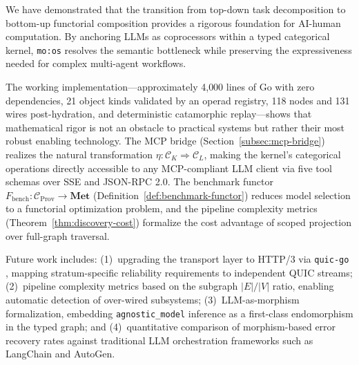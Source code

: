 \documentclass[submission,copyright,creativecommons]{eptcs}
\begin{document}
We have demonstrated that the transition from top-down task decomposition to
bottom-up functorial composition provides a rigorous foundation for
AI-human computation. By anchoring LLMs as coprocessors within a typed
categorical kernel, \texttt{mo:os} resolves the semantic bottleneck while
preserving the expressiveness needed for complex multi-agent workflows.

The working implementation---approximately 4{,}000 lines of Go with zero
dependencies, 21 object kinds validated by an operad registry, 118 nodes and
131 wires post-hydration, and deterministic catamorphic replay---shows that
mathematical rigor is not an obstacle to practical systems but rather their
most robust enabling technology.
The MCP bridge (Section~\ref{subsec:mcp-bridge}) realizes the natural
transformation $\eta\colon \mathcal{C}_K \Rightarrow \mathcal{C}_L$, making
the kernel's categorical operations directly accessible to any MCP-compliant
LLM client via five tool schemas over SSE and JSON-RPC 2.0. The benchmark
functor $F_{\mathrm{bench}}\colon \mathcal{C}_{\mathrm{Prov}} \to
\mathbf{Met}$ (Definition~\ref{def:benchmark-functor}) reduces model selection
to a functorial optimization problem, and the pipeline complexity metrics
(Theorem~\ref{thm:discovery-cost}) formalize the cost advantage of scoped
projection over full-graph traversal.

Future work includes:
(1)~upgrading the transport layer to HTTP/3 via \texttt{quic-go}
\cite{rfc9114}, mapping stratum-specific reliability requirements to
independent QUIC streams;
(2)~pipeline complexity metrics based on the subgraph $|E|/|V|$ ratio,
enabling automatic detection of over-wired subsystems;
(3)~LLM-as-morphism formalization, embedding \texttt{agnostic\_model} inference
as a first-class endomorphism in the typed graph;
and (4)~quantitative comparison of morphism-based error recovery rates against
traditional LLM orchestration frameworks such as LangChain and AutoGen.



\end{document}

